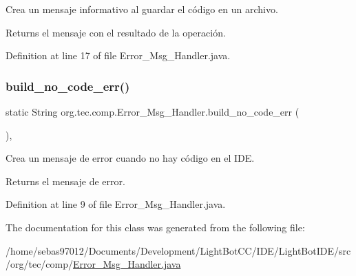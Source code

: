 Crea un mensaje informativo al guardar el código en un archivo. \begin{DoxyReturn}{Returns}
el mensaje con el resultado de la operación. 
\end{DoxyReturn}


Definition at line 17 of file Error\+\_\+\+Msg\+\_\+\+Handler.\+java.

\mbox{\label{classorg_1_1tec_1_1comp_1_1_error___msg___handler_a85a5bcc4fea0f63bb6f6950ac1011679}} 
\subsubsection{\texorpdfstring{build\+\_\+no\+\_\+code\+\_\+err()}{build\_no\_code\_err()}}
{\footnotesize\ttfamily static String org.\+tec.\+comp.\+Error\+\_\+\+Msg\+\_\+\+Handler.\+build\+\_\+no\+\_\+code\+\_\+err (\begin{DoxyParamCaption}{ }\end{DoxyParamCaption})\hspace{0.3cm}{\ttfamily [inline]}, {\ttfamily [static]}}

Crea un mensaje de error cuando no hay código en el I\+DE. \begin{DoxyReturn}{Returns}
el mensaje de error. 
\end{DoxyReturn}


Definition at line 9 of file Error\+\_\+\+Msg\+\_\+\+Handler.\+java.



The documentation for this class was generated from the following file\+:\begin{DoxyCompactItemize}
\item 
/home/sebas97012/\+Documents/\+Development/\+Light\+Bot\+C\+C/\+I\+D\+E/\+Light\+Bot\+I\+D\+E/src/org/tec/comp/\mbox{\hyperlink{_error___msg___handler_8java}{Error\+\_\+\+Msg\+\_\+\+Handler.\+java}}\end{DoxyCompactItemize}
